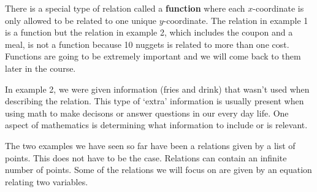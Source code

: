 \documentclass[nooutcomes]{ximera}
\begin{document}
\begin{example}
\begin{explanation}
\begin{image}
\end{image}
\end{explanation}
\end{example}


\begin{remark}
There is a special type of relation called a \textbf{function} where each $x$-coordinate is only allowed to be related to one unique $y$-coordinate.  The relation in example 1 is a function but the relation in example 2, which includes the coupon and a meal, is not a function because 10 nuggets is related to more than one cost.  Functions are going to be extremely important and we will come back to them later in the course.
\end{remark}

\begin{MM}
In example 2, we were given information (fries and drink) that wasn't used when describing the relation.  This type of `extra' information is usually present when using math to make decisons or answer questions in our every day life. One aspect of mathematics is determining what information to include or is relevant.
\end{MM}

The two examples we have seen so far have been a relations given by a list of points.  This does not have to be the case.  Relations can contain an infinite number of points.  Some of the relations we will focus on are given by an equation relating two variables.
\end{document}

